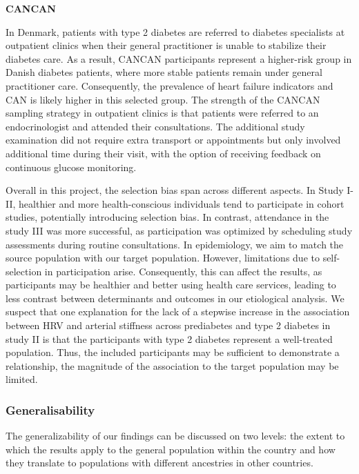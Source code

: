 \documentclass[
  a4paper,
  headsepline=true,
  open=any]{scrbook}
\begin{document}
\textbf{CANCAN}

In Denmark, patients with type 2 diabetes are referred to diabetes
specialists at outpatient clinics when their general practitioner is
unable to stabilize their diabetes care. As a result, CANCAN
participants represent a higher-risk group in Danish diabetes patients,
where more stable patients remain under general practitioner care.
Consequently, the prevalence of heart failure indicators and CAN is
likely higher in this selected group. The strength of the CANCAN
sampling strategy in outpatient clinics is that patients were referred
to an endocrinologist and attended their consultations. The additional
study examination did not require extra transport or appointments but
only involved additional time during their visit, with the option of
receiving feedback on continuous glucose monitoring.

Overall in this project, the selection bias span across different
aspects. In Study I-II, healthier and more health-conscious individuals
tend to participate in cohort studies, potentially introducing selection
bias. In contrast, attendance in the study III was more successful, as
participation was optimized by scheduling study assessments during
routine consultations. In epidemiology, we aim to match the source
population with our target population. However, limitations due to
self-selection in participation arise. Consequently, this can affect the
results, as participants may be healthier and better using health care
services, leading to less contrast between determinants and outcomes in
our etiological analysis. We suspect that one explanation for the lack
of a stepwise increase in the association between HRV and arterial
stiffness across prediabetes and type 2 diabetes in study II is that the
participants with type 2 diabetes represent a well-treated population.
Thus, the included participants may be sufficient to demonstrate a
relationship, the magnitude of the association to the target population
may be limited.

\hypertarget{generalisability}{%
\subsubsection{Generalisability}\label{generalisability}}

The generalizability of our findings can be discussed on two levels: the
extent to which the results apply to the general population within the
country and how they translate to populations with different ancestries
in other countries.
\end{document}
